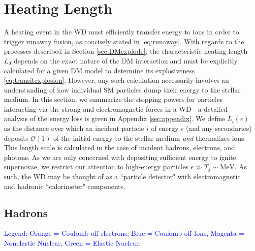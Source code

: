 \documentclass[twocolumn,showpacs,preprintnumbers,amsmath,amssymb,prd]{revtex4}
\newcommand{\OO}{\mathcal{O}}
\begin{document}
\section{Heating Length}
\label{sec:HeatingLength}
A heating event in the WD must efficiently transfer energy to ions in order to trigger runaway fusion, as concisely stated in \eqref{eq:runaway}. With regards to the processes described in Section \ref{sec:DMexplode}, the characteristic heating length $L_0$ depends on the exact nature of the DM interaction and must be explicitly calculated for a given DM model to determine its explosiveness \eqref{eq:transitexplosion}. However, any such calculation necessarily involves an understanding of how individual SM particles dump their energy to the stellar medium. In this section, we summarize the stopping powers for particles interacting via the strong and electromagnetic forces in a WD - a detailed analysis of the energy loss is given in Appendix \ref{sec:appendix}. We define $L_i(\epsilon)$ as the distance over which an incident particle $i$ of energy $\epsilon$ (and any secondaries) deposits $\OO(1)$ of the initial energy to the stellar medium \emph{and} thermalizes ions. This length scale is calculated in the case of incident hadrons, electrons, and photons. As we are only concerned with depositing sufficient energy to ignite supernovae, we restrict our attention to high-energy particles $\epsilon \gg T_f \sim \text{MeV}$. As such, the WD may be thought of as a ``particle detector" with electromagnetic and hadronic ``calorimeter" components.

\subsection{Hadrons}
\textcolor{blue}{Legend: Orange = Coulomb off electrons, Blue = Coulomb off Ions, Magenta = Nonelastic Nuclear, Green = Elastic Nuclear.}
\end{document}
